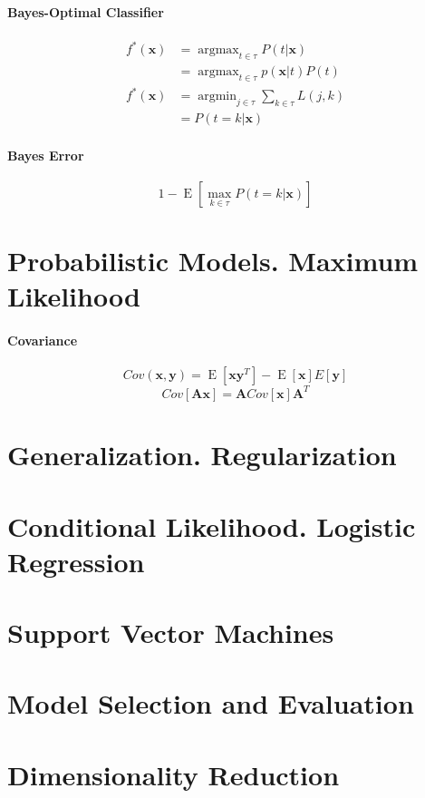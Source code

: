 \documentclass[7pt]{scrartcl}
\DeclareMathOperator*{\argmax}{argmax}
\DeclareMathOperator*{\argmin}{argmin}
\DeclareMathOperator{\E}{E}
\begin{document}
\begin{multicols}{4}
\paragraph{Bayes-Optimal Classifier}
\begin{align*}
f^*(\mathbf x) &= \argmax_{t \in \tau} P(t|\mathbf x) \\ 
&= \argmax_{t \in \tau} p(\mathbf x|t) P(t) \\
f^*(\mathbf x) &= \argmin_{j \in \tau} \sum_{k \in \tau} L(j,k) \\ 
 &= P(t = k | \mathbf x) \end{align*}

\paragraph{Bayes Error}
\begin{equation*} 1 - \E \left [ \max_{k\in\tau} P(t = k | \mathbf x) \right ] \end{equation*}

\section{Probabilistic Models. Maximum Likelihood}
\paragraph{Covariance}

$$Cov(\mathbf x, \mathbf y) = \E[\mathbf x \mathbf y ^ T] - \E[\mathbf x]E[\mathbf y]$$
$$Cov[\mathbf A \mathbf x] = \mathbf A Cov[\mathbf x] \mathbf A^T$$


\section{Generalization. Regularization}
\section{Conditional Likelihood. Logistic Regression}
\section{Support Vector Machines}
\section{Model Selection and Evaluation}
\section{Dimensionality Reduction}

\end{multicols}
\end{document}
